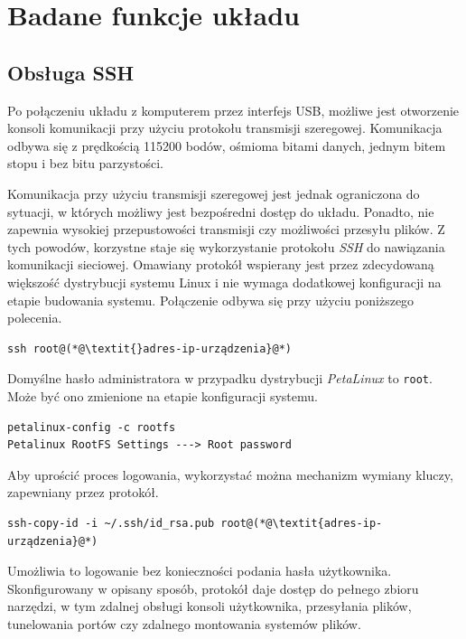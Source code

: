 \chapter{Badane funkcje układu}

\section{Obsługa SSH}
\label{sec:ssh}
Po połączeniu układu z komputerem przez interfejs USB, możliwe jest otworzenie konsoli komunikacji przy użyciu protokołu transmisji szeregowej. Komunikacja odbywa się z prędkością 115200 bodów, ośmioma bitami danych, jednym bitem stopu i bez bitu parzystości.

Komunikacja przy użyciu transmisji szeregowej jest jednak ograniczona do sytuacji, w których możliwy jest bezpośredni dostęp do układu. Ponadto, nie zapewnia wysokiej przepustowości transmisji czy możliwości przesyłu plików. Z tych powodów, korzystne staje się wykorzystanie protokołu \emph{SSH} do nawiązania komunikacji sieciowej.
Omawiany protokół wspierany jest przez zdecydowaną większość dystrybucji systemu Linux i nie wymaga dodatkowej konfiguracji na etapie budowania systemu. Połączenie odbywa się przy użyciu poniższego polecenia.

\begin{lstlisting}[breaklines=true]
ssh root@(*@\textit{}adres-ip-urządzenia}@*)
\end{lstlisting}

Domyślne hasło administratora w przypadku dystrybucji \emph{PetaLinux} to \texttt{root}. Może być ono zmienione na etapie konfiguracji systemu.


\begin{lstlisting}[breaklines=true]
petalinux-config -c rootfs
Petalinux RootFS Settings ---> Root password
\end{lstlisting}

Aby uprościć proces logowania, wykorzystać można mechanizm wymiany kluczy, zapewniany przez protokół.

\begin{lstlisting}[breaklines=true]
ssh-copy-id -i ~/.ssh/id_rsa.pub root@(*@\textit{adres-ip-urządzenia}@*)
\end{lstlisting}

Umożliwia to logowanie bez konieczności podania hasła użytkownika. Skonfigurowany w opisany sposób, protokół daje dostęp do pełnego zbioru narzędzi, w tym zdalnej obsługi konsoli użytkownika, przesyłania plików, tunelowania portów czy zdalnego montowania systemów plików.
